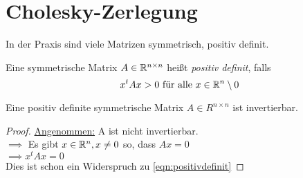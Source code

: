 \section{Cholesky-Zerlegung}
In der Praxis sind viele Matrizen symmetrisch, positiv definit.
\begin{definition}
Eine symmetrische Matrix $A \in \mathbb{R}^{n\times n}$ heißt \emph{positiv definit}, falls 
\begin{equation}
\label{eqn:positivdefinit}
x^{t}Ax  > 0 \text{ für alle } x \in \mathbb{R}^{n}\setminus{0}
\end{equation}
\end{definition}
\begin{lemma}
	Eine positiv definite symmetrische Matrix $A \in R^{n\times n}$ ist invertierbar.
\end{lemma}
\begin{proof}
\underline{Angenommen:} A ist nicht invertierbar. \\
$\implies$ Es gibt $x \in \mathbb{R}^{n}, x\neq 0$ so, dass $Ax=0$ \\
$\implies x^{t}Ax=0$ \\
Dies ist schon ein Widerspruch zu \eqref{eqn:positivdefinit}
\end{proof}

